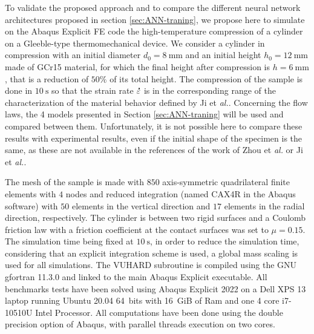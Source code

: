 \documentclass[algorithms,article,submit,pdftex,moreauthors]{Definitions/mdpi}
\makeatletter
\DeclareRobustCommand{\mdot}[1]{\accentset{\mbox{\bfseries .}}{#1}}
\DeclareRobustCommand{\eal}{et \emph{al.}\@\xspace}
\makeatother
\begin{document}
To validate the proposed approach and to compare the different neural network architectures proposed in section \ref{sec:ANN-traning}, we propose here to simulate on the Abaqus Explicit FE code the high-temperature compression of a cylinder on a Gleeble-type thermomechanical device.
We consider a cylinder in compression with an initial diameter $d_0=8~\text{mm}$ and an initial height $h_0=12~\text{mm}$ made of GCr15 material, for which the final height after compression is $h=6~\text{mm}$, that is a reduction of $50\%$ of its total height.
The compression of the sample is done in $10~\text{s}$ so that the strain rate  $\mdot\varepsilon$ is in the corresponding range of the characterization of the material behavior defined by Ji \eal \cite{Ji-2018}.
Concerning the flow laws, the 4 models presented in Section \ref{sec:ANN-traning} will be used and compared between them.
Unfortunately, it is not possible here to compare these results with experimental results, even if the initial shape of the specimen is the same, as these are not available in the references of the work of Zhou \eal \cite{Zhou-2020} or Ji \eal \cite{Ji-2018}.

The mesh of the sample is made with $850$ axis-symmetric quadrilateral finite elements with $4$ nodes and reduced integration (named CAX4R in the Abaqus software) with $50$ elements in the vertical direction and $17$ elements in the radial direction, respectively.
The cylinder is between two rigid surfaces and a Coulomb friction law with a friction coefficient at the contact surfaces was set to $\mu=0.15$.
The simulation time being fixed at $10~\text{s}$, in order to reduce the simulation time, considering that an explicit integration scheme is used, a global mass scaling is used for all simulations.
The VUHARD subroutine is compiled using the GNU gfortran 11.3.0 and linked to the main Abaqus Explicit executable.
All benchmarks tests have been solved using Abaqus Explicit 2022 on a Dell XPS 13 laptop running Ubuntu 20.04 64~bits with 16~GiB of Ram and one 4 core i7-10510U Intel Processor.
All computations have been done using the double precision option of Abaqus, with parallel threads execution on two cores.
\end{document}

